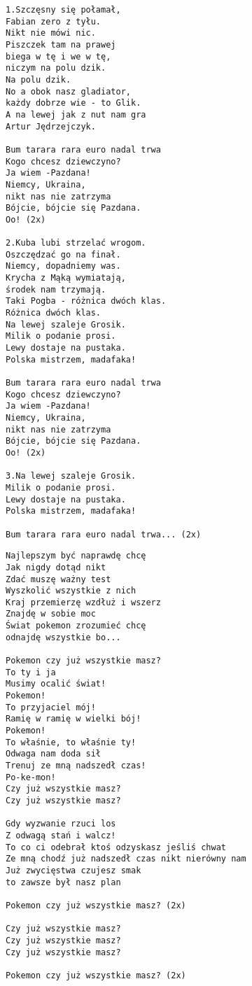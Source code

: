 \documentclass[12pt]{article}
\begin{document}
\begin{verbatim}
1.Szczęsny się połamał,
Fabian zero z tyłu.
Nikt nie mówi nic.
Piszczek tam na prawej
biega w tę i we w tę,
niczym na polu dzik.
Na polu dzik.
No a obok nasz gladiator,
każdy dobrze wie - to Glik.
A na lewej jak z nut nam gra
Artur Jędrzejczyk.

Bum tarara rara euro nadal trwa
Kogo chcesz dziewczyno?
Ja wiem -Pazdana!
Niemcy, Ukraina,
nikt nas nie zatrzyma
Bójcie, bójcie się Pazdana.
Oo! (2x)

2.Kuba lubi strzelać wrogom.
Oszczędzać go na finał.
Niemcy, dopadniemy was.
Krycha z Mąką wymiatają,
środek nam trzymają.
Taki Pogba - różnica dwóch klas.
Różnica dwóch klas.
Na lewej szaleje Grosik.
Milik o podanie prosi.
Lewy dostaje na pustaka.
Polska mistrzem, madafaka!

Bum tarara rara euro nadal trwa
Kogo chcesz dziewczyno?
Ja wiem -Pazdana!
Niemcy, Ukraina,
nikt nas nie zatrzyma
Bójcie, bójcie się Pazdana.
Oo! (2x)

3.Na lewej szaleje Grosik.
Milik o podanie prosi.
Lewy dostaje na pustaka.
Polska mistrzem, madafaka!

Bum tarara rara euro nadal trwa... (2x)
\end{verbatim}
\clearpage

\begin{verbatim}
Najlepszym być naprawdę chcę
Jak nigdy dotąd nikt
Zdać muszę ważny test
Wyszkolić wszystkie z nich
Kraj przemierzę wzdłuż i wszerz
Znajdę w sobie moc
Świat pokemon zrozumieć chcę
odnajdę wszystkie bo...

Pokemon czy już wszystkie masz?
To ty i ja
Musimy ocalić świat!
Pokemon!
To przyjaciel mój!
Ramię w ramię w wielki bój!
Pokemon!
To właśnie, to właśnie ty!
Odwaga nam doda sił
Trenuj ze mną nadszedł czas!
Po-ke-mon!
Czy już wszystkie masz?
Czy już wszystkie masz?

Gdy wyzwanie rzuci los
Z odwagą stań i walcz!
To co ci odebrał ktoś odzyskasz jeśliś chwat
Ze mną chodź już nadszedł czas nikt nierówny nam
Już zwycięstwa czujesz smak
to zawsze był nasz plan

Pokemon czy już wszystkie masz? (2x)

Czy już wszystkie masz?
Czy już wszystkie masz?
Czy już wszystkie masz?

Pokemon czy już wszystkie masz? (2x)
\end{verbatim}
\clearpage
\end{document}
